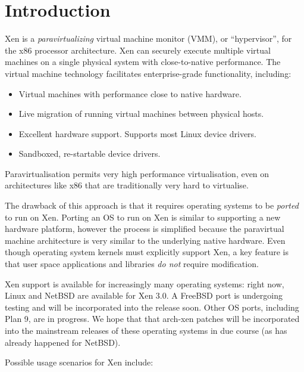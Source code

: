 \chapter{Introduction}


Xen is a \emph{paravirtualizing} virtual machine monitor (VMM), or
``hypervisor'', for the x86 processor architecture.  Xen can securely
execute multiple virtual machines on a single physical system with
close-to-native performance.  The virtual machine technology
facilitates enterprise-grade functionality, including:

\begin{itemize}
\item Virtual machines with performance close to native hardware.
\item Live migration of running virtual machines between physical
  hosts.
\item Excellent hardware support. Supports most Linux device drivers.
\item Sandboxed, re-startable device drivers.
\end{itemize}

Paravirtualisation permits very high performance virtualisation, even
on architectures like x86 that are traditionally very hard to
virtualise.

The drawback of this approach is that it requires operating systems to
be \emph{ported} to run on Xen.  Porting an OS to run on Xen is
similar to supporting a new hardware platform, however the process is
simplified because the paravirtual machine architecture is very
similar to the underlying native hardware. Even though operating
system kernels must explicitly support Xen, a key feature is that user
space applications and libraries \emph{do not} require modification.

Xen support is available for increasingly many operating systems:
right now, Linux and NetBSD are available for Xen 3.0.
A FreeBSD port is undergoing testing and will be incorporated into the
release soon. Other OS ports, including Plan 9, are in progress.  We
hope that that arch-xen patches will be incorporated into the
mainstream releases of these operating systems in due course (as has
already happened for NetBSD).

Possible usage scenarios for Xen include:

